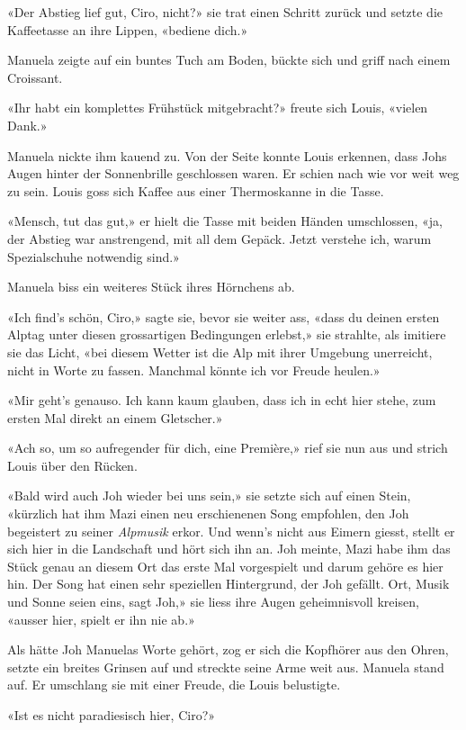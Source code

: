 «Der Abstieg lief gut, Ciro, nicht?» sie trat einen Schritt zurück und
setzte die Kaffeetasse an ihre Lippen, «bediene dich.»

Manuela zeigte auf ein buntes Tuch am Boden, bückte sich und griff nach
einem Croissant.

«Ihr habt ein komplettes Frühstück mitgebracht?» freute sich Louis,
«vielen Dank.»

Manuela nickte ihm kauend zu.
Von der Seite konnte Louis erkennen, dass Johs Augen hinter der
Sonnenbrille geschlossen waren. Er schien nach wie vor weit weg zu sein.
Louis goss sich Kaffee aus einer Thermoskanne in die Tasse.

«Mensch, tut das gut,» er hielt die Tasse mit beiden Händen umschlossen,
«ja, der Abstieg war anstrengend, mit all dem Gepäck. Jetzt verstehe
ich, warum Spezialschuhe notwendig sind.»

Manuela biss ein weiteres Stück ihres Hörnchens ab.

«Ich find’s schön, Ciro,» sagte sie, bevor sie weiter ass, «dass du
deinen ersten Alptag unter diesen grossartigen Bedingungen erlebst,» sie
strahlte, als imitiere sie das Licht, «bei diesem Wetter ist die Alp mit
ihrer Umgebung unerreicht, nicht in Worte zu fassen. Manchmal könnte ich
vor Freude heulen.»

«Mir geht’s genauso. Ich kann kaum glauben, dass ich in echt hier stehe,
zum ersten Mal direkt an einem Gletscher.»

«Ach so, um so aufregender für dich, eine Première,» rief sie nun aus
und strich Louis über den Rücken.

«Bald wird auch Joh wieder bei uns sein,» sie setzte sich auf einen
Stein, «kürzlich hat ihm Mazi einen neu erschienenen Song empfohlen, den
Joh begeistert zu seiner \emph{Alpmusik} erkor. Und wenn’s nicht aus
Eimern giesst, stellt er sich hier in die Landschaft und hört sich ihn
an. Joh meinte, Mazi habe ihm das Stück genau an diesem Ort das erste
Mal vorgespielt und darum gehöre es hier hin. Der Song hat einen sehr
speziellen Hintergrund, der Joh gefällt. Ort, Musik und Sonne seien
eins, sagt Joh,» sie liess ihre Augen geheimnisvoll kreisen, «ausser
hier, spielt er ihn nie ab.»

Als hätte Joh Manuelas Worte gehört, zog er sich die Kopfhörer aus den
Ohren, setzte ein breites Grinsen auf und streckte seine Arme weit aus.
Manuela stand auf. Er umschlang sie mit einer Freude, die Louis belustigte. 

«Ist es nicht paradiesisch hier, Ciro?»

